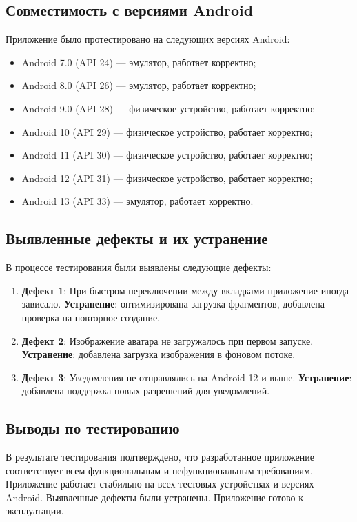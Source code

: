 \subsection{Совместимость с версиями Android}

Приложение было протестировано на следующих версиях Android:
\begin{itemize}
	\item Android 7.0 (API 24) — эмулятор, работает корректно;
	\item Android 8.0 (API 26) — эмулятор, работает корректно;
	\item Android 9.0 (API 28) — физическое устройство, работает корректно;
	\item Android 10 (API 29) — физическое устройство, работает корректно;
	\item Android 11 (API 30) — физическое устройство, работает корректно;
	\item Android 12 (API 31) — физическое устройство, работает корректно;
	\item Android 13 (API 33) — эмулятор, работает корректно.
\end{itemize}

\subsection{Выявленные дефекты и их устранение}

В процессе тестирования были выявлены следующие дефекты:
\begin{enumerate}
	\item \textbf{Дефект 1}: При быстром переключении между вкладками приложение иногда зависало. \textbf{Устранение}: оптимизирована загрузка фрагментов, добавлена проверка на повторное создание.
	\item \textbf{Дефект 2}: Изображение аватара не загружалось при первом запуске. \textbf{Устранение}: добавлена загрузка изображения в фоновом потоке.
	\item \textbf{Дефект 3}: Уведомления не отправлялись на Android 12 и выше. \textbf{Устранение}: добавлена поддержка новых разрешений для уведомлений.
\end{enumerate}

\subsection{Выводы по тестированию}

В результате тестирования подтверждено, что разработанное приложение соответствует всем функциональным и нефункциональным требованиям. Приложение работает стабильно на всех тестовых устройствах и версиях Android. Выявленные дефекты были устранены. Приложение готово к эксплуатации.